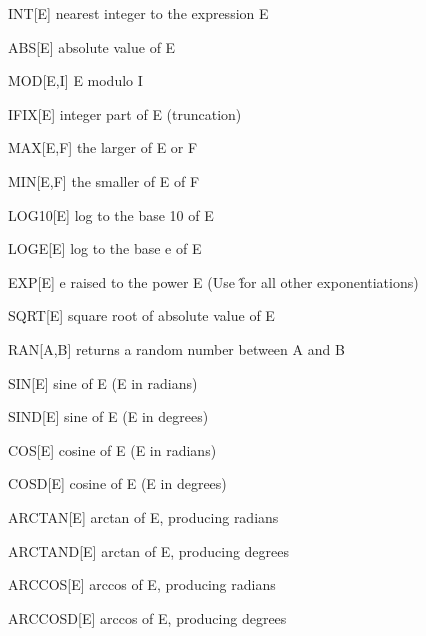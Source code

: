 {\newpage\clearpage
{}%
\begin{example}
  \item[INT{[E]}\hfill]{nearest integer to the expression E}
  \item[ABS{[E]}\hfill]{absolute value of E}
  \item[MOD{[E,I]}\hfill]{E modulo I}
  \item[IFIX{[E]}\hfill]{integer part of E (truncation)}
  \item[MAX{[E,F]}\hfill]{the larger of E or F}
  \item[MIN{[E,F]}\hfill]{the smaller of E of F}
  \item[LOG10{[E]}\hfill]{log to the base 10 of E}
  \item[LOGE{[E]}\hfill]{log to the base e of E}
  \item[EXP{[E]}\hfill]{e raised to the power E (Use \^ 
       for all other exponentiations)}
  \item[SQRT{[E]}\hfill]{square root of absolute value of E}
  \item[RAN{[A,B]}\hfill]{returns a random number between A and B}
\end{example}%
\lthtmlfigureZ
\lthtmlcheckvsize\clearpage}

{\newpage\clearpage
{}%
\begin{example}
  \item[SIN{[E]}\hfill]{sine of E (E in radians)}
  \item[SIND{[E]}\hfill]{sine of E (E in degrees)}
  \item[COS{[E]}\hfill]{cosine of E (E in radians)}
  \item[COSD{[E]}\hfill]{cosine of E (E in degrees)}
  \item[ARCTAN{[E]}\hfill]{arctan of E, producing radians}
  \item[ARCTAND{[E]}\hfill]{arctan of E, producing degrees}
  \item[ARCCOS{[E]}\hfill]{arccos of E, producing radians}
  \item[ARCCOSD{[E]}\hfill]{arccos of E, producing degrees}
\end{example}%
\lthtmlfigureZ
\lthtmlcheckvsize\clearpage}

